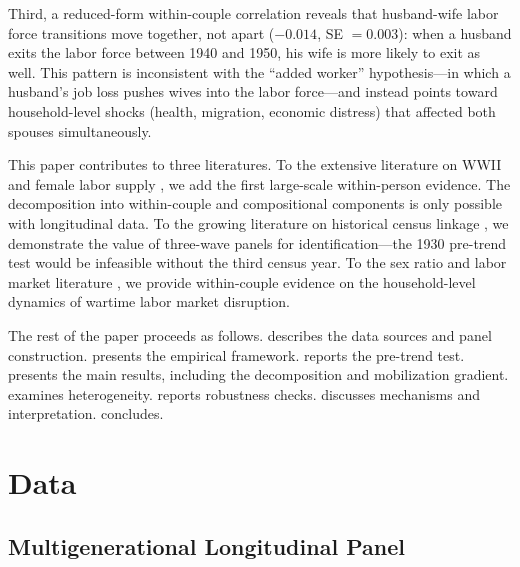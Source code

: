 \documentclass[12pt]{article}
\begin{document}
Third, a reduced-form within-couple correlation reveals that husband-wife labor force transitions move together, not apart ($-0.014$, SE $= 0.003$): when a husband exits the labor force between 1940 and 1950, his wife is more likely to exit as well. This pattern is inconsistent with the ``added worker'' hypothesis---in which a husband's job loss pushes wives into the labor force---and instead points toward household-level shocks (health, migration, economic distress) that affected both spouses simultaneously.

This paper contributes to three literatures. To the extensive literature on WWII and female labor supply \citep{goldin1991role, acemoglu2004women, goldin2013shocking, rose2018rise, bellou2016occupations, nix2022maternal}, we add the first large-scale within-person evidence. The decomposition into within-couple and compositional components is only possible with longitudinal data. To the growing literature on historical census linkage \citep{abramitzky2012europe, abramitzky2014nation, bailey2020howwell, feigenbaum2016automated, helgertz2023mlp}, we demonstrate the value of three-wave panels for identification---the 1930 pre-trend test would be infeasible without the third census year. To the sex ratio and labor market literature \citep{angrist2002sex, brainerd2017lasting, gay2022missing}, we provide within-couple evidence on the household-level dynamics of wartime labor market disruption.

The rest of the paper proceeds as follows.  describes the data sources and panel construction.  presents the empirical framework.  reports the pre-trend test.  presents the main results, including the decomposition and mobilization gradient.  examines heterogeneity.  reports robustness checks.  discusses mechanisms and interpretation.  concludes.



\section{Data}
\label{sec:data}

\subsection{Multigenerational Longitudinal Panel}
\end{document}
